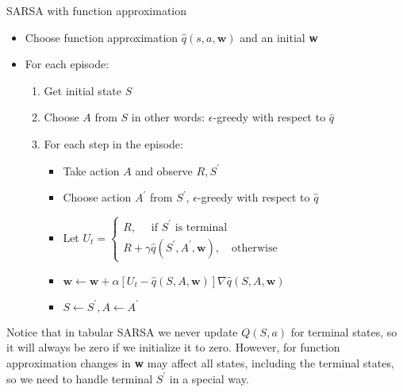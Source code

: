 \begin{wbox}{SARSA with function approximation}
\begin{itemize}
	\item Choose function approximation $\hat{q}(s,a,\textbf{w})$ and an initial \textbf{w}
	\item For each episode:
	\begin{enumerate}
		\item Get initial state $S$
		\item Choose $A$ from $S$ in other words: $\epsilon$-greedy with respect to $\hat{q}$
		\item For each step in the episode:
		\begin{itemize}
			\item Take action $A$ and observe $R, S^{\prime}$
			\item Choose action $A^{\prime}$ from $S^{\prime}$, $\epsilon$-greedy with respect to $\hat{q}$
			\item Let $U_t = \begin{cases}
			R, \quad \text{ if } S^{\prime} \text{ is terminal }  \\
			R + \gamma \hat{q}(S^{\prime},A^{\prime},\textbf{w}), \quad \text{otherwise}  
			\end{cases}$
			\item  $\textbf{w} \leftarrow \textbf{w} +  \alpha [U_t - \hat{q}(S,A,\textbf{w})] \nabla \hat{q}(S,A,\textbf{w})$
			\item $S \leftarrow S^{\prime}, A \leftarrow A^{\prime}$	 
		\end{itemize}
	\end{enumerate}
\end{itemize}
Notice that in tabular SARSA we never update $Q(S,a)$ for terminal states, so it will always be zero if we initialize it to zero. However, for function approximation changes in \textbf{w} may affect all states, including the terminal states, so we need to handle terminal $S^{\prime}$ in a special way.
\end{wbox}






